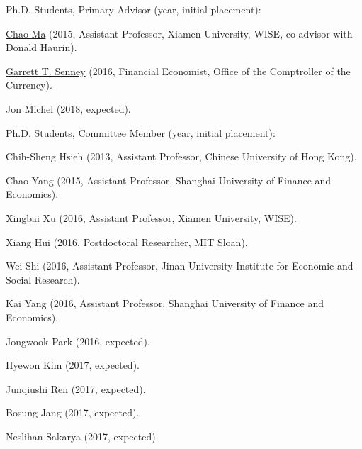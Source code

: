 \documentclass[10pt,letterpaper]{article}
\renewenvironment{itemize}{
  \begin{list}{}{
    \setlength{\leftmargin}{1.5em}
    \setlength{\itemsep}{0.25em}
    \setlength{\parskip}{0pt}
    \setlength{\parsep}{0.25em}
  }
}{
  \end{list}
}
\begin{document}
\begin{itemize}
\item Ph.D. Students, Primary Advisor (year, initial placement):
  \begin{itemize}
  \item \href{http://chaoma2014.weebly.com}{Chao Ma} (2015, Assistant Professor, Xiamen University, WISE, co-advisor with Donald Haurin).
  \item \href{http://garrettsenney.weebly.com}{Garrett T. Senney} (2016, Financial Economist, Office of the Comptroller of the Currency).
  \item Jon Michel (2018, expected).
  \end{itemize}
\item Ph.D. Students, Committee Member (year, initial placement):
  \begin{itemize}
  \item Chih-Sheng Hsieh (2013, Assistant Professor, Chinese University of Hong Kong).
  \item Chao Yang (2015, Assistant Professor, Shanghai University of Finance and Economics).
  \item Xingbai Xu (2016, Assistant Professor, Xiamen University, WISE).
  \item Xiang Hui (2016, Postdoctoral Researcher, MIT Sloan).
  \item Wei Shi (2016, Assistant Professor, Jinan University Institute for Economic and Social Research).
  \item Kai Yang (2016, Assistant Professor, Shanghai University of Finance and Economics).
  \item Jongwook Park (2016, expected).
  \item Hyewon Kim (2017, expected).
  \item Junqiushi Ren (2017, expected).
  \item Bosung Jang (2017, expected).
  \item Neslihan Sakarya (2017, expected).

\end{itemize}
\end{itemize}
\end{document}
